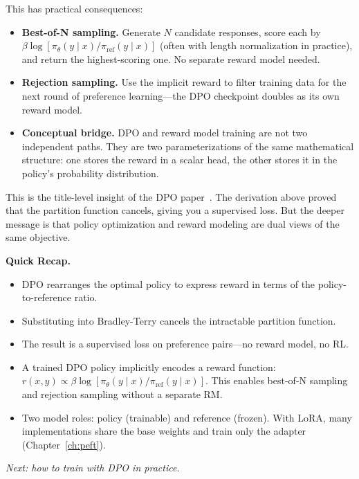 This has practical consequences:

\begin{itemize}[nosep]
  \item \textbf{Best-of-N sampling.} Generate $N$ candidate responses, score each by $\beta \log [\pi_\theta(y \mid x) / \pi_{\text{ref}}(y \mid x)]$ (often with length normalization in practice), and return the highest-scoring one. No separate reward model needed.
  \item \textbf{Rejection sampling.} Use the implicit reward to filter training data for the next round of preference learning---the DPO checkpoint doubles as its own reward model.
  \item \textbf{Conceptual bridge.} DPO and reward model training are not two independent paths. They are two parameterizations of the same mathematical structure: one stores the reward in a scalar head, the other stores it in the policy's probability distribution.
\end{itemize}

This is the title-level insight of the DPO paper~\cite{rafailov2023dpo}. The derivation above proved that the partition function cancels, giving you a supervised loss. But the deeper message is that policy optimization and reward modeling are dual views of the same objective.

\begin{quickrecap}
\textbf{Quick Recap.}
\begin{itemize}[nosep,leftmargin=1.5em]
  \item DPO rearranges the optimal policy to express reward in terms of the policy-to-reference ratio.
  \item Substituting into Bradley-Terry cancels the intractable partition function.
  \item The result is a supervised loss on preference pairs---no reward model, no RL.
  \item A trained DPO policy implicitly encodes a reward function: $r(x,y) \propto \beta \log [\pi_\theta(y \mid x) / \pi_{\text{ref}}(y \mid x)]$. This enables best-of-N sampling and rejection sampling without a separate RM.
  \item Two model roles: policy (trainable) and reference (frozen). With LoRA, many implementations share the base weights and train only the adapter (Chapter~\ref{ch:peft}).
\end{itemize}
\textit{Next: how to train with DPO in practice.}
\end{quickrecap}


